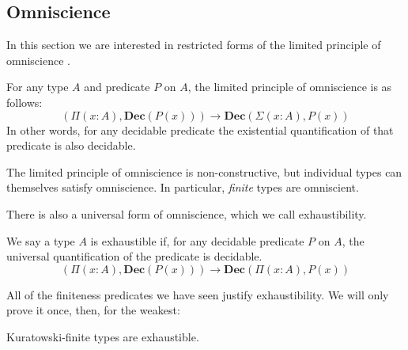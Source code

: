 \subsection{Omniscience}
In this section we are interested in restricted forms of the limited principle
of omniscience \cite{myhillErrettBishopFoundations1972}.
\begin{rm-definition}
  For any type \(A\) and predicate \(P\) on \(A\), the limited principle of
  omniscience is as follows:
  \begin{equation}
    \left( \Pi {(x : A)} , \mathbf{Dec}(P(x)) \right) \rightarrow \mathbf{Dec} \left( \Sigma {(x : A)} , P(x) \right)
  \end{equation}
  In other words, for any decidable predicate the existential quantification of
  that predicate is also decidable.
\end{rm-definition}
The limited principle of omniscience is non-constructive, but individual types
can themselves satisfy omniscience.
In particular, \emph{finite} types are omniscient.

There is also a universal form of omniscience, which we call exhaustibility.
\begin{rm-definition}[Exhaustibility]
  We say a type \(A\) is exhaustible if, for any decidable predicate \(P\) on
  \(A\), the universal quantification of the predicate is decidable.
  \begin{equation}
    \left( \Pi {(x : A)} , \mathbf{Dec}(P(x)) \right) \rightarrow \mathbf{Dec} \left( \Pi {(x : A)} , P(x) \right)
  \end{equation}
\end{rm-definition}

All of the finiteness predicates we have seen justify exhaustibility.
We will only prove it once, then, for the weakest:
\begin{rm-theorem}
  Kuratowski-finite types are exhaustible.
\end{rm-theorem}

